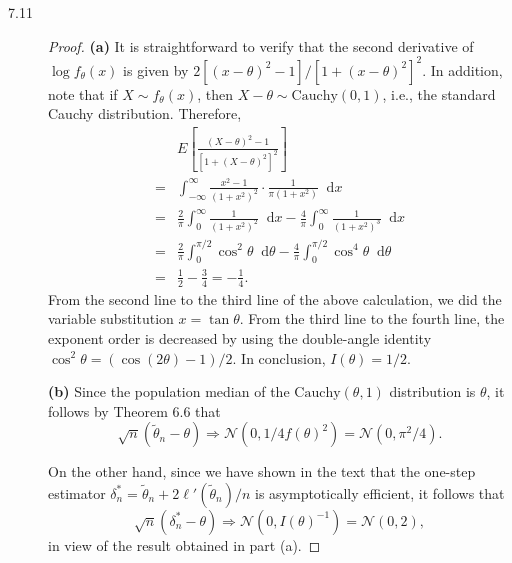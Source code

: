 \documentclass{article}
\newcommand{\dd}{\mathop{}\!\mathrm{d}}
\newcommand{\gaussian}{\mathcal{N}}
\theoremstyle{definition}
\theoremstyle{plain}
\theoremstyle{remark}
\begin{document}
\begin{description}
\item[7.11]
\begin{proof}
\textbf{(a)}
It is straightforward to verify that the second derivative 
of $\log f_\theta(x)$ is given by $2[(x - \theta)^2 - 1]/
[1 + (x - \theta)^2]^2$. In addition, note that if $X \sim 
f_\theta(x)$, then $X - \theta \sim \text{Cauchy}(0, 1)$, 
i.e., the standard Cauchy distribution. Therefore,
\begin{align*}
   & E\left[\frac{(X - \theta)^2 - 1}{[1 + (X - \theta)^2]^2}\right] \\
 = & \int_{-\infty}^\infty \frac{x^2 - 1}{(1 + x^2)^2} \cdot \frac{1}{\pi(1 + x^2)} \dd x \\
 = & \frac{2}{\pi}\int_{0}^\infty \frac{1}{(1 + x^2)^2} \dd x - \frac{4}{\pi}\int_0^\infty \frac{1}{(1 + x^2)^3} \dd x \\
 = & \frac{2}{\pi}\int_0^{\pi/2} \cos^2\theta \dd \theta - \frac{4}{\pi}\int_0^{\pi/2} \cos^4\theta \dd \theta \\
 = & \frac{1}{2} - \frac{3}{4} = -\frac{1}{4}.
\end{align*}
From the second line to the third line of the above
calculation, we did the variable substitution $x = \tan
\theta$. From the third 
line to the fourth line, the exponent order is decreased by
using the double-angle identity $\cos^2\theta = (\cos(2\theta) - 1)/2$. In conclusion, $I(\theta) = 1/2$.

\textbf{(b)} Since the population median of the $\text{Cauchy}(\theta, 1)$ distribution is $\theta$, it 
follows by Theorem 6.6 that 
$$\sqrt{n}(\tilde{\theta}_n - \theta) \Rightarrow \gaussian(0,
1/4f(\theta)^2) = \gaussian(0, \pi^2/4).$$ 

On the other hand, since we have shown in the text that the 
one-step estimator $\delta_n^*
= \tilde{\theta}_n + 2\ell'(\tilde{\theta}_n)/n$ is 
asymptotically efficient, it follows that
\begin{equation*}
    \sqrt{n}(\delta_n^* - \theta) \Rightarrow 
    \gaussian(0, I(\theta)^{-1}) = \gaussian(0, 2),
\end{equation*}
in view of the result obtained in part (a). 
\end{proof}


\end{description}
\end{document}
